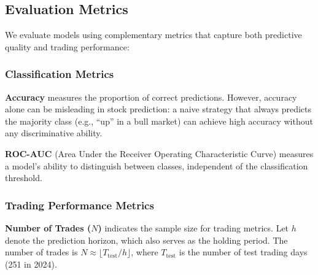 \documentclass[a4paper,10pt,conference]{IEEEtran}
\begin{document}


\subsection{Evaluation Metrics}

We evaluate models using complementary metrics that capture both predictive quality and trading performance:

\subsubsection{Classification Metrics}

\textbf{Accuracy} measures the proportion of correct predictions. However, accuracy alone can be misleading in stock prediction: a naive strategy that always predicts the majority class (e.g., ``up'' in a bull market) can achieve high accuracy without any discriminative ability.

\textbf{ROC-AUC} (Area Under the Receiver Operating Characteristic Curve) measures a model's ability to distinguish between classes, independent of the classification threshold.%

\subsubsection{Trading Performance Metrics}

\textbf{Number of Trades ($N$)} indicates the sample size for trading metrics. Let $h$ denote the prediction horizon, which also serves as the holding period. The number of trades is $N \approx \lfloor T_{\text{test}} / h \rfloor$, where $T_{\text{test}}$ is the number of test trading days (251 in 2024).
\end{document}
